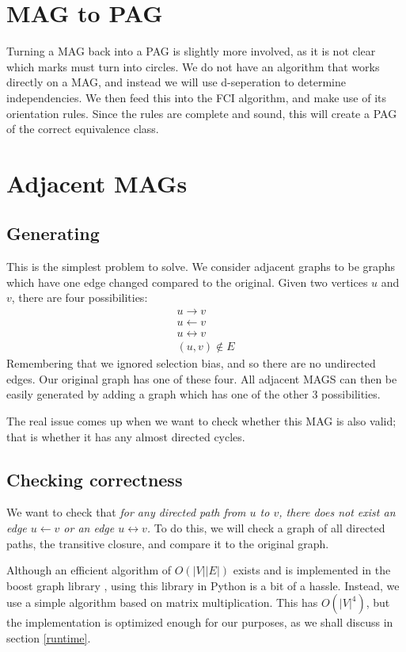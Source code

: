 \documentclass[11pt,a4paper]{report}
\begin{document}
\section{MAG to PAG}
Turning a MAG back into a PAG is slightly more involved, as it is not
clear which marks must turn into circles. We do not have an algorithm that
works directly on a MAG, and instead we will use d-seperation to determine
independencies. We then feed this into the FCI algorithm, and make use of
its orientation rules. Since the rules are complete and sound, this will
create a PAG of the correct equivalence class.

\section{Adjacent MAGs}
\subsection{Generating}
This is the simplest problem to solve. We consider adjacent graphs to be
graphs which have one edge changed compared to the original. Given two
vertices $u$ and $v$, there are four possibilities:
\begin{align}
  u \rightarrow v \\
  u \leftarrow v \\
  u \leftrightarrow v\\
  (u, v) \notin E
\end{align}
Remembering that we ignored selection bias, and so there are no undirected
edges. Our original graph has one of these four. All adjacent MAGS can
then be easily generated by adding a graph which has one of the other 3
possibilities.

The real issue comes up when we want to check whether this MAG is also
valid; that is whether it has any almost directed cycles.

\subsection{Checking correctness}\label{transitive_closure}
We want to check that \emph{for any directed path from $u$ to $v$, there
does not exist an edge $u \leftarrow v$ or an edge $u \leftrightarrow v$.
} To do this, we will check a graph of all directed paths, the transitive
closure, and compare it to the original graph.

Although an efficient algorithm of $O(|V||E|)$ exists
\cite{purdomTransitiveClosureAlgorithm1970} and is implemented in the
boost graph library \cite{siekBoostGraphLibrary2002}, using this library
in Python is a bit of a hassle. Instead, we use a simple algorithm based
on matrix multiplication. This has $O(|V|^4)$, but the implementation is
optimized enough for our purposes, as we shall discuss in section
\ref{runtime}.
\end{document}

